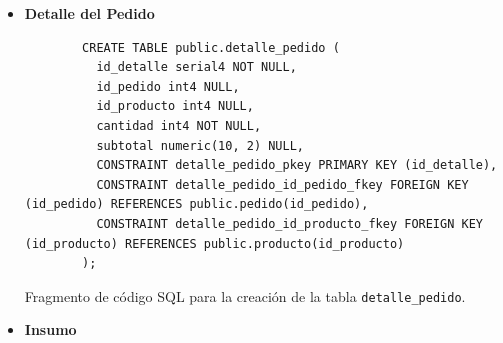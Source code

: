 \begin{itemize}
    \newpage
    \item \textbf{Detalle del Pedido}
    \begin{listing}[H]
        \centering
        \begin{verbatim}
        CREATE TABLE public.detalle_pedido (
          id_detalle serial4 NOT NULL,
          id_pedido int4 NULL,
          id_producto int4 NULL,
          cantidad int4 NOT NULL,
          subtotal numeric(10, 2) NULL,
          CONSTRAINT detalle_pedido_pkey PRIMARY KEY (id_detalle),
          CONSTRAINT detalle_pedido_id_pedido_fkey FOREIGN KEY (id_pedido) REFERENCES public.pedido(id_pedido),
          CONSTRAINT detalle_pedido_id_producto_fkey FOREIGN KEY (id_producto) REFERENCES public.producto(id_producto)
        );
        \end{verbatim}
        \caption{Fragmento de código SQL para la creación de la tabla \texttt{detalle\_pedido}.}
        \label{lst:detalle_pedido}
    \end{listing}
    \item \textbf{Insumo}

\end{itemize}

